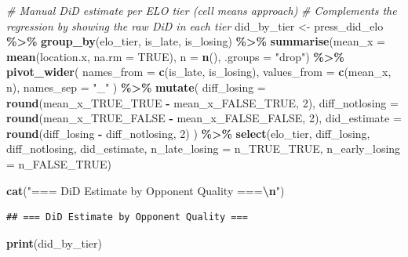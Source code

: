 \documentclass[
]{article}
\newenvironment{Shaded}{\begin{snugshade}}{\end{snugshade}}
\newcommand{\AttributeTok}[1]{\textcolor[rgb]{0.13,0.29,0.53}{#1}}
\newcommand{\CommentTok}[1]{\textcolor[rgb]{0.56,0.35,0.01}{\textit{#1}}}
\newcommand{\ConstantTok}[1]{\textcolor[rgb]{0.56,0.35,0.01}{#1}}
\newcommand{\DecValTok}[1]{\textcolor[rgb]{0.00,0.00,0.81}{#1}}
\newcommand{\FunctionTok}[1]{\textcolor[rgb]{0.13,0.29,0.53}{\textbf{#1}}}
\newcommand{\NormalTok}[1]{#1}
\newcommand{\OtherTok}[1]{\textcolor[rgb]{0.56,0.35,0.01}{#1}}
\newcommand{\SpecialCharTok}[1]{\textcolor[rgb]{0.81,0.36,0.00}{\textbf{#1}}}
\newcommand{\StringTok}[1]{\textcolor[rgb]{0.31,0.60,0.02}{#1}}
\begin{document}
\begin{Shaded}
\begin{Highlighting}[]
\CommentTok{\# Manual DiD estimate per ELO tier (cell means approach)}
\CommentTok{\# Complements the regression by showing the raw DiD in each tier}
\NormalTok{did\_by\_tier }\OtherTok{\textless{}{-}}\NormalTok{ press\_did\_elo }\SpecialCharTok{\%\textgreater{}\%}
  \FunctionTok{group\_by}\NormalTok{(elo\_tier, is\_late, is\_losing) }\SpecialCharTok{\%\textgreater{}\%}
  \FunctionTok{summarise}\NormalTok{(}\AttributeTok{mean\_x =} \FunctionTok{mean}\NormalTok{(location.x, }\AttributeTok{na.rm =} \ConstantTok{TRUE}\NormalTok{), }\AttributeTok{n =} \FunctionTok{n}\NormalTok{(), }\AttributeTok{.groups =} \StringTok{"drop"}\NormalTok{) }\SpecialCharTok{\%\textgreater{}\%}
  \FunctionTok{pivot\_wider}\NormalTok{(}
    \AttributeTok{names\_from  =} \FunctionTok{c}\NormalTok{(is\_late, is\_losing),}
    \AttributeTok{values\_from =} \FunctionTok{c}\NormalTok{(mean\_x, n),}
    \AttributeTok{names\_sep   =} \StringTok{"\_"}
\NormalTok{  ) }\SpecialCharTok{\%\textgreater{}\%}
  \FunctionTok{mutate}\NormalTok{(}
    \AttributeTok{diff\_losing    =} \FunctionTok{round}\NormalTok{(mean\_x\_TRUE\_TRUE  }\SpecialCharTok{{-}}\NormalTok{ mean\_x\_FALSE\_TRUE,  }\DecValTok{2}\NormalTok{),}
    \AttributeTok{diff\_notlosing =} \FunctionTok{round}\NormalTok{(mean\_x\_TRUE\_FALSE }\SpecialCharTok{{-}}\NormalTok{ mean\_x\_FALSE\_FALSE, }\DecValTok{2}\NormalTok{),}
    \AttributeTok{did\_estimate   =} \FunctionTok{round}\NormalTok{(diff\_losing }\SpecialCharTok{{-}}\NormalTok{ diff\_notlosing, }\DecValTok{2}\NormalTok{)}
\NormalTok{  ) }\SpecialCharTok{\%\textgreater{}\%}
  \FunctionTok{select}\NormalTok{(elo\_tier, diff\_losing, diff\_notlosing, did\_estimate,}
         \AttributeTok{n\_late\_losing =}\NormalTok{ n\_TRUE\_TRUE, }\AttributeTok{n\_early\_losing =}\NormalTok{ n\_FALSE\_TRUE)}

\FunctionTok{cat}\NormalTok{(}\StringTok{"=== DiD Estimate by Opponent Quality ===}\SpecialCharTok{\textbackslash{}n}\StringTok{"}\NormalTok{)}
\end{Highlighting}
\end{Shaded}

\begin{verbatim}
## === DiD Estimate by Opponent Quality ===
\end{verbatim}

\begin{Shaded}
\begin{Highlighting}[]
\FunctionTok{print}\NormalTok{(did\_by\_tier)}
\end{Highlighting}
\end{Shaded}
\end{document}
